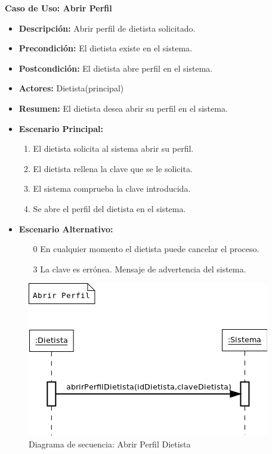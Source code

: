\textbf{Caso de Uso: Abrir Perfil}
\begin{itemize}
\item \textbf{Descripción:} Abrir perfil de dietista solicitado.
\item \textbf{Precondición:} El dietista existe en el sistema.
\item \textbf{Postcondición:} El dietista abre perfil en el sistema.
\item \textbf{Actores:} Dietista(principal)
\item \textbf{Resumen:} El dietista desea abrir su perfil en el sistema.
\item \textbf{Escenario Principal:}
\begin{enumerate}
\item El dietista solicita al sistema abrir su perfil.
\item El dietista rellena la clave que se le solicita.
\item El sistema comprueba la clave introducida.
\item Se abre el perfil del dietista en el sistema.
\end{enumerate}
\item \textbf{Escenario Alternativo:}
\begin{enumerate}
\item[0] En cualquier momento el dietista puede cancelar el proceso.
\item[3] La clave es errónea. Mensaje de advertencia del sistema.
\end{enumerate}
\end{itemize}
\begin{figure}[H]
  \label{ds_abrirdietista}
  \begin{center}
    \includegraphics[scale=0.7]{../img/DS_AbrirDietista.png}
  \end{center}
  \caption{Diagrama de secuencia: Abrir Perfil Dietista}
\end{figure}
